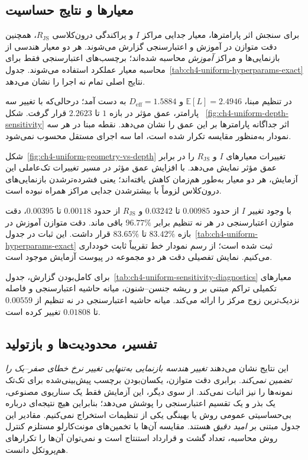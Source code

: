 \subsection{معیارها و نتایج حساسیت}
\label{subsec:ch4-uniform-sensitivity-results}
برای سنجش اثر پارامترها،
معیار جدایی مراکز $I$ و پراکندگی درون‌کلاسی
$R_{\mathrm{JS}}$، همچنین
دقت متوازن در آموزش و اعتبارسنجی
گزارش می‌شوند. هر دو معیار هندسی از
بازنمایی‌ها و مراکز \emph{آموزش}
محاسبه شده‌اند؛ برچسب‌های اعتبارسنجی
فقط برای محاسبه معیار عملکرد استفاده می‌شوند.
جدول~\ref{tab:ch4-uniform-hyperparams-exact}
نتایج اصلی تمام نه اجرا را نشان می‌دهد.


در تنظیم مبنا،
$\mathbb E[L]=2.4946$ و
$D_{\mathrm{eff}}=1.5884$ به دست آمد؛
درحالی‌که با تغییر سه پارامتر،
عمق مؤثر در بازه $1$ تا $2.2623$
قرار گرفت. شکل
~\ref{fig:ch4-uniform-depth-sensitivity}
اثر جداگانه پارامترها بر این عمق را
نشان می‌دهد. نقطه مبنا در هر سه نمودار
به‌منظور مقایسه تکرار شده است،
اما سه اجرای مستقل محسوب نمی‌شود.


شکل~\ref{fig:ch4-uniform-geometry-vs-depth}
تغییرات معیارهای $I$ و
$R_{\mathrm{JS}}$ را در برابر
عمق مؤثر نمایش می‌دهد.
با افزایش عمق مؤثر در مسیر تغییرات
تک‌عاملی این آزمایش، هر دو معیار
به‌طور هم‌زمان کاهش یافته‌اند؛
یعنی فشرده‌ترشدن بازنمایی‌های درون‌کلاس
لزوماً با بیشترشدن جدایی مراکز همراه نبوده است.


با وجود تغییر $I$ از حدود
$0.00985$ تا $0.03242$ و
$R_{\mathrm{JS}}$ از حدود
$0.00118$ تا $0.00395$،
دقت متوازن اعتبارسنجی در هر
نه تنظیم برابر $96.77\%$ باقی ماند.
دقت متوازن آموزش در بازه
$83.42\%$ تا $83.65\%$
قرار داشت. این ثبات در جدول~\ref{tab:ch4-uniform-hyperparams-exact} ثبت شده است؛ از رسم نمودار خط تقریباً ثابت خودداری می‌کنیم. نمایش تفصیلی دقت هر دو مجموعه در پیوست آزمایش موجود است.

برای کامل‌بودن گزارش،
جدول~\ref{tab:ch4-uniform-sensitivity-diagnostics}
معیارهای تکمیلی تراکم مبتنی بر
 و ریشه جنسن--شنون،
میانه حاشیه اعتبارسنجی و
فاصله نزدیک‌ترین زوج مرکز را
ارائه می‌کند. میانه حاشیه اعتبارسنجی
در نه تنظیم از $0.00559$ تا
$0.01808$ تغییر کرده است.


\subsection{تفسیر، محدودیت‌ها و بازتولید}
\label{subsec:ch4-uniform-sensitivity-discussion}
این نتایج نشان می‌دهند
\emph{تغییر هندسه بازنمایی به‌تنهایی
تغییر نرخ خطای صفر--یک را تضمین نمی‌کند}.
برابری دقت متوازن، یکسان‌بودن برچسب
پیش‌بینی‌شده برای تک‌تک نمونه‌ها را
نیز اثبات نمی‌کند. از سوی دیگر،
این آزمایش فقط یک سناریوی مصنوعی،
یک بذر و یک تقسیم اعتبارسنجی را
پوشش می‌دهد؛ بنابراین هیچ نتیجه‌ای
درباره بی‌حساسیتی عمومی روش یا
بهینگی یکی از تنظیمات استخراج نمی‌کنیم.
مقادیر این جدول مبتنی بر \emph{امید دقیق} هستند. مقایسه آن‌ها با تخمین‌های مونت‌کارلو مستلزم کنترل روش محاسبه، تعداد گشت و قرارداد استنتاج است و نمی‌توان آن‌ها را تکرارهای هم‌پروتکل دانست.

